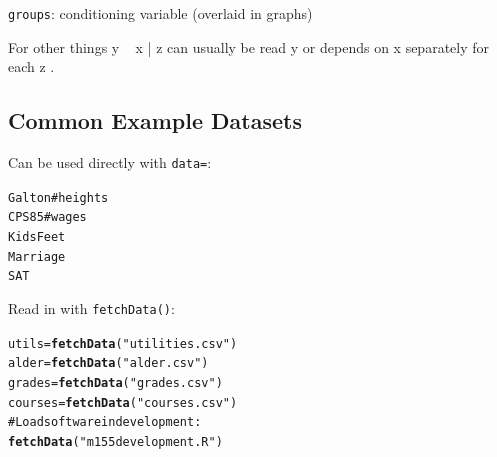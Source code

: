 \documentclass{report}\usepackage{graphicx, color}
\makeatletter
\newcommand{\hlfunctioncall}[1]{\textcolor[rgb]{0.501960784313725,0,0.329411764705882}{\textbf{#1}}}%
\newcommand{\hlstring}[1]{\textcolor[rgb]{0.6,0.6,1}{#1}}%
\newcommand{\hlcomment}[1]{\textcolor[rgb]{0.180392156862745,0.6,0.341176470588235}{#1}}%
\newenvironment{kframe}{%
 \def\at@end@of@kframe{}%
 \ifinner\ifhmode%
  \def\at@end@of@kframe{\end{minipage}}%
  \begin{minipage}{\columnwidth}%
 \fi\fi%
 \def\FrameCommand##1{\hskip\@totalleftmargin \hskip-\fboxsep
 \colorbox{shadecolor}{##1}\hskip-\fboxsep
     \hskip-\linewidth \hskip-\@totalleftmargin \hskip\columnwidth}%
 \MakeFramed {\advance\hsize-\width
   \@totalleftmargin\z@ \linewidth\hsize
   \@setminipage}}%
 {\par\unskip\endMakeFramed%
 \at@end@of@kframe}
\newenvironment{knitrout}{}{} %
\makeatother
\begin{document}
\begin{multicols}{4}
\noindent  \texttt{groups}: conditioning variable (overlaid in graphs)

For other things y ~ x | z
 can usually be read y
 or depends on x
 separately for each z
.

\subsection*{Common Example Datasets}
Can be used directly with \texttt{data=}:
\begin{knitrout}
\color{fgcolor}\begin{kframe}
\begin{alltt}
Galton       \hlcomment{# heights}
CPS85        \hlcomment{# wages}
KidsFeet
Marriage
SAT
\end{alltt}
\end{kframe}
\end{knitrout}


Read in with \texttt{fetchData()}:
\begin{knitrout}
\color{fgcolor}\begin{kframe}
\begin{alltt}
utils = \hlfunctioncall{fetchData}(\hlstring{"utilities.csv"})
alder = \hlfunctioncall{fetchData}(\hlstring{"alder.csv"})
grades = \hlfunctioncall{fetchData}(\hlstring{"grades.csv"})
courses = \hlfunctioncall{fetchData}(\hlstring{"courses.csv"})
\hlcomment{# Load software in development:}
\hlfunctioncall{fetchData}(\hlstring{"m155development.R"})
\end{alltt}
\end{kframe}
\end{knitrout}



\vfill

\end{multicols}

\newpage


\def\opt#1{#1}
\def\squeeze{\vspace*{-4ex}}
\end{document}
